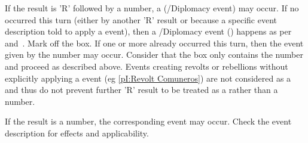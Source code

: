 \aparag[Revolts] If the result is 'R' followed by a number, a \RD
(\REVOLT/Diplomacy event) may occur.
\bparag If no \RD occurred this turn (either by another 'R' result or
because a specific event description told to apply a \RD event), then a
\REVOLT/Diplomacy event (\RD) happens as per~
and~. Mark off the box.
\bparag If one or more \RD already occurred this turn, then the
event given by the number may occur. Consider that the box only
contains the number and proceed as described above.
\bparag Events creating revolts or rebellions without explicitly
applying a \RD event (eg \ref{pI:Revolt Comuneros}) are not considered
as a \RD and thus do not prevent further 'R' result to be treated as a
\RD rather than a number.

\aparag If the result is a number, the corresponding event may occur.
\bparag Check the event description for effects and applicability.

